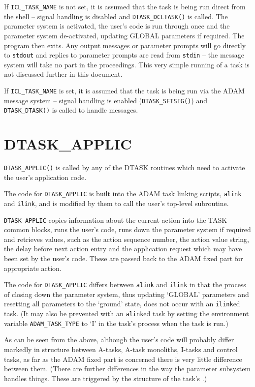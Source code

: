 \documentclass[twoside,11pt,nolof]{starlink}
\begin{document}
If \texttt{ICL\_TASK\_NAME} is not set, it is assumed that the task is being
run direct from the shell -- signal handling is disabled and
\texttt{DTASK\_DCLTASK()} is called. The parameter system is activated, the
user's code is run through once and the parameter system de-activated, updating
GLOBAL parameters if required. The program then exits. Any output messages
or parameter prompts will go directly to \texttt{stdout} and replies to
parameter prompts are read from \texttt{stdin} -- the message system will take
no part in the proceedings.
This very simple running of a task is not discussed further in this document.

If \texttt{ICL\_TASK\_NAME} is set, it is assumed that the task is being run
via the ADAM message system -- signal handling is enabled
(\texttt{DTASK\_SETSIG()}) and \texttt{DTASK\_DTASK()} is called to handle
messages.

\section{\label{dtask_applic}DTASK\_APPLIC}
\texttt{DTASK\_APPLIC()} is called by any of the DTASK routines which need to
activate the user's application code.

The code for \texttt{DTASK\_APPLIC} is built into the ADAM task linking
scripts, \texttt{alink} and \texttt{ilink}, and is modified by them to call
the user's top-level subroutine.

\texttt{DTASK\_APPLIC} copies information about the current action into the
TASK common blocks, runs the user's code, runs down the parameter system
if required and retrieves values, such as the action sequence number, the
action value string, the delay before next action entry and the application
request which may have been set by the user's code. These are passed back to
the ADAM fixed part for appropriate action.

The code for \texttt{DTASK\_APPLIC} differs between \texttt{alink} and
\texttt{ilink} in that the process of closing down the parameter system, thus
updating `GLOBAL' parameters and resetting all parameters to the `ground'
state, does not occur with an \texttt{ilink}ed task.
(It may also be prevented with an \texttt{alink}ed task by setting the
environment variable \texttt{ADAM\_TASK\_TYPE} to `I' in the task's process
when the task is run.)

As can be seen from the above, although the user's code will probably differ
markedly in structure between A-tasks, A-task monoliths, I-tasks and control
tasks, as far as the ADAM fixed part is concerned there is very little
difference between them.
(There are further differences in the way the parameter subsystem handles
things. These are triggered by the structure of the task's
.)
\end{document}
